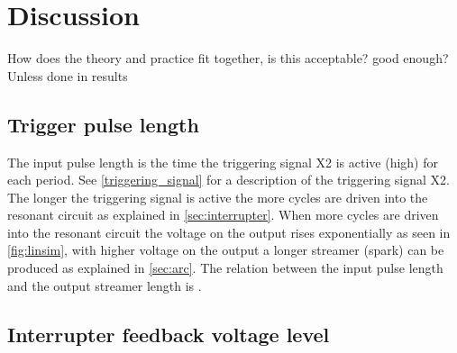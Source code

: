 \chapter{Discussion}
How does the theory and practice fit together, is this acceptable? good enough? Unless done in results


\section{Trigger pulse length}
The input pulse length is the time the triggering signal X2 is active (high) for each period. See \cref{triggering_signal} for a description of the triggering signal X2. The longer the triggering signal is active the more cycles are driven into the resonant circuit as explained in \cref{sec:interrupter}. When more cycles are driven into the resonant circuit the voltage on the output rises exponentially as seen in \cref{fig:linsim}, with higher voltage on the output a longer streamer (spark) can be produced as explained in \cref{sec:arc}. The relation between the input pulse length and the output streamer length is .

\section{Interrupter feedback voltage level}

